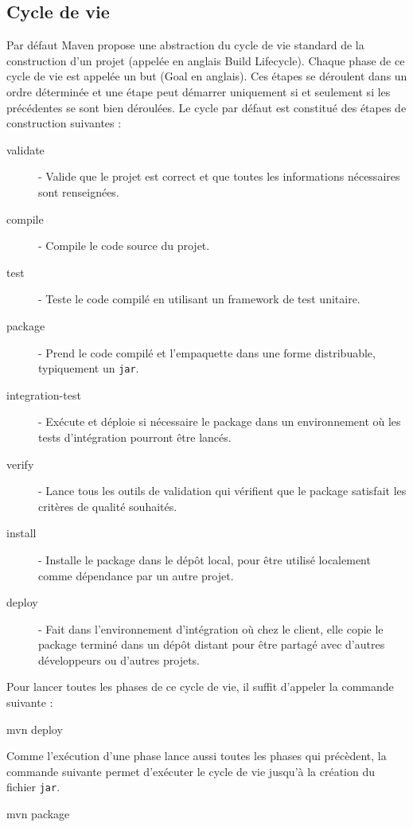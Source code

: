 \documentclass[a4paper,11pt]{article}
\begin{document}
\subsection{Cycle de vie}
Par défaut Maven propose une abstraction du cycle de vie standard de la construction d'un projet (appelée en anglais Build Lifecycle). 
Chaque phase de ce cycle de vie est appelée un but (Goal en anglais). Ces étapes se déroulent dans un ordre déterminée et 
une étape peut démarrer uniquement si et seulement si les précédentes se sont bien déroulées. Le cycle par défaut est constitué 
des étapes de construction suivantes :
\begin{description}
  \item[validate] - Valide que le projet est correct et que toutes les informations nécessaires sont renseignées.
  \item[compile] - Compile le code source du projet.
  \item[test] - Teste le code compilé en utilisant un framework de test unitaire.
  \item[package] - Prend le code compilé et l'empaquette dans une forme distribuable, typiquement un \texttt{jar}.
  \item[integration-test] - Exécute et déploie si nécessaire le package dans un environnement où les tests d'intégration pourront être lancés.
  \item[verify] - Lance tous les outils de validation qui  vérifient que le package satisfait les critères de qualité souhaités.
  \item[install] - Installe le package dans le dépôt local, pour être utilisé localement comme dépendance par un autre projet.
  \item[deploy] - Fait dans l'environnement d'intégration où chez le client, elle copie le package terminé dans un dépôt distant 
  pour être partagé avec d'autres développeurs ou d'autres projets.
\end{description}
Pour lancer toutes les phases de ce cycle de vie, il suffit d'appeler la commande suivante : 
\begin{code_shell}
mvn deploy
\end{code_shell}

Comme l'exécution d'une phase lance aussi toutes les phases qui précèdent, la commande suivante permet d'exécuter le cycle 
de vie jusqu'à la création du fichier \texttt{jar}.
\begin{code_shell}
mvn package
\end{code_shell}
\end{document}
